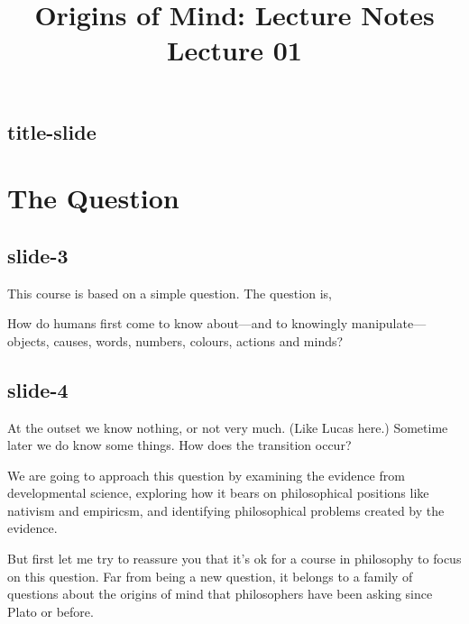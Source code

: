 \documentclass[12pt,\papersize]{extarticle}
\begin{document}
\setlength\footnotesep{1em}






\title {Origins of Mind: Lecture Notes \\ Lecture 01}
 
 
 
\maketitle
 
 
 
\subsection{title-slide}
 
 
\section{The Question}
 
 
 
\subsection{slide-3}
This course is based on a simple question. The question is,
 
How do humans first come to know about---and to knowingly manipulate---objects, causes, words, numbers, colours, actions and minds?
 
 
 
\subsection{slide-4}
At the outset we know nothing, or not very much. (Like Lucas here.) Sometime later we do know some things. How does the transition occur?
 
We are going to approach this question by examining the evidence from developmental science, exploring how it bears on philosophical positions like nativism and empiricsm, and identifying philosophical problems created by the evidence.
 
But first let me try to reassure you that it's ok for a course in philosophy to focus on this question. Far from being a new question, it belongs to a family of questions about the origins of mind that philosophers have been asking since Plato or before.
 
 
 
\end{document}
